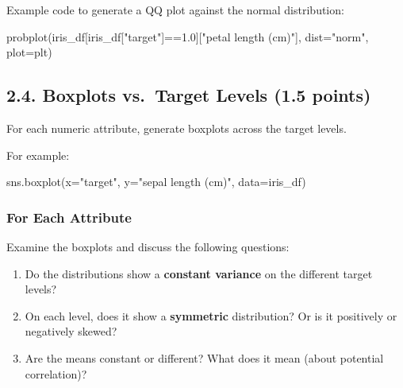 \documentclass[
  letterpaper,
]{scrbook}
\newenvironment{Shaded}{\begin{snugshade}}{\end{snugshade}}
\newcommand{\FloatTok}[1]{\textcolor[rgb]{0.68,0.00,0.00}{#1}}
\newcommand{\NormalTok}[1]{\textcolor[rgb]{0.00,0.23,0.31}{#1}}
\newcommand{\OperatorTok}[1]{\textcolor[rgb]{0.37,0.37,0.37}{#1}}
\newcommand{\StringTok}[1]{\textcolor[rgb]{0.13,0.47,0.30}{#1}}
\providecommand{\tightlist}{%
  \setlength{\itemsep}{0pt}\setlength{\parskip}{0pt}}
\begin{document}
Example code to generate a QQ plot against the normal distribution:

\begin{Shaded}
\begin{Highlighting}[]
\NormalTok{probplot(iris\_df[iris\_df[}\StringTok{"target"}\NormalTok{]}\OperatorTok{==}\FloatTok{1.0}\NormalTok{][}\StringTok{"petal length (cm)"}\NormalTok{], dist}\OperatorTok{=}\StringTok{"norm"}\NormalTok{, plot}\OperatorTok{=}\NormalTok{plt)}
\end{Highlighting}
\end{Shaded}

\subsection*{2.4. Boxplots vs.~Target Levels (1.5
points)}\label{boxplots-vs.-target-levels-1.5-points}

For each numeric attribute, generate boxplots across the target levels.

For example:

\begin{Shaded}
\begin{Highlighting}[]
\NormalTok{sns.boxplot(x}\OperatorTok{=}\StringTok{"target"}\NormalTok{, y}\OperatorTok{=}\StringTok{"sepal length (cm)"}\NormalTok{, data}\OperatorTok{=}\NormalTok{iris\_df)}
\end{Highlighting}
\end{Shaded}

\subsubsection*{For Each Attribute}\label{for-each-attribute}

Examine the boxplots and discuss the following questions:

\begin{enumerate}
\def\labelenumi{\arabic{enumi}.}
\tightlist
\item
  Do the distributions show a \textbf{constant variance} on the
  different target levels?
\item
  On each level, does it show a \textbf{symmetric} distribution? Or is
  it positively or negatively skewed?
\item
  Are the means constant or different? What does it mean (about
  potential correlation)?
\end{enumerate}
\end{document}

